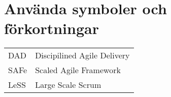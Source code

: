 %
%


\section*{Använda symboler och förkortningar}

\begin{center}
\begin{tabular}{p{}p{}}

DAD & Discipilined Agile Delivery \\ 
SAFe & Scaled Agile Framework \\ 
LeSS & Large Scale Scrum \\

\end{tabular}
\end{center}

\vspace{10mm}



